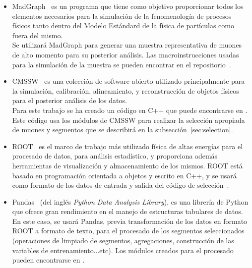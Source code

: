 \begin{itemize}

\item MadGraph~\cite{Alwall:2014hca} es un programa que tiene como objetivo proporcionar todos los elementos necesarios para la simulaci\'on de la fenomenolog\'ia de procesos f\'isicos tanto dentro del Modelo Est\'andard de la f\'isica de part\'iculas como fuera del mismo. \\
Se utilizar\'a MadGraph para generar una muestra representativa de muones de alto momento para su posterior an\'alisis. Las macroinstrucciones usadas para la simulaci\'on de la muestra se pueden encontrar en el repositorio~\cite{generator}.

\item CMSSW~\cite{cmssw} es una colecci\'on de software abierto utilizado principalmente para la simulaci\'on, calibraci\'on, alineamiento, y reconstrucci\'on de objetos f\'isicos para el posterior an\'alisis de los datos. \\
Para este trabajo se ha creado un c\'odigo en C++ que puede encontrarse en \cite{analyzer}. Este c\'odigo usa los m\'odulos de CMSSW para realizar la selecci\'on apropiada de muones y segmentos que se describir\'a en la subsecci\'on~\ref{sec:selection}. 

\item ROOT~\cite{root} es el marco de trabajo m\'as utilizado f\'isica de altas energ\'ias para el procesado de datos, para an\'alisis estad\'istico, y proporciona adem\'as herramientas de visualizaci\'on y almacenamiento de los mismos. ROOT est\'a basado en programaci\'on orientada a objetos y escrito en C++, y se usar\'a como formato de los datos de entrada y salida del c\'odigo de selecci\'on~\cite{analyzer}.

\item Pandas~\cite{mckinney-proc-scipy-2010} (del ingl\'es \textit{Python Data Analysis Library}), es una librer\'ia de Python que ofrece gran rendimiento en el manejo de estructuras tabulares de datos. \\
En este caso, se usar\'a Pandas, previa transformaci\'on de los datos en formato ROOT a formato de texto, para el procesado de los segmentos seleccionados (operaciones de limpiado de segmentos, agregaciones, construcci\'on de las variables de entrenamiento...etc). Los m\'odulos creados para el procesado pueden encontrarse en \cite{processor}.

\end{itemize}


